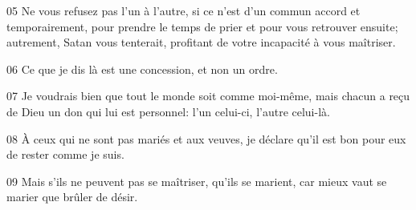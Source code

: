 
05 Ne vous refusez pas l’un à l’autre, si ce n’est d’un commun accord et temporairement, pour prendre le temps de prier et pour vous retrouver ensuite; autrement, Satan vous tenterait, profitant de votre incapacité à vous maîtriser.

06 Ce que je dis là est une concession, et non un ordre.

07 Je voudrais bien que tout le monde soit comme moi-même, mais chacun a reçu de Dieu un don qui lui est personnel: l’un celui-ci, l’autre celui-là.

08 À ceux qui ne sont pas mariés et aux veuves, je déclare qu’il est bon pour eux de rester comme je suis.

09 Mais s’ils ne peuvent pas se maîtriser, qu’ils se marient, car mieux vaut se marier que brûler de désir.
